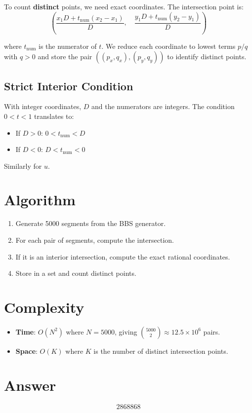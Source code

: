 \documentclass[12pt]{article}
\begin{document}
To count \textbf{distinct} points, we need exact coordinates. The intersection point is:
\[
\left(\frac{x_1 D + t_{\text{num}} (x_2 - x_1)}{D}, \quad \frac{y_1 D + t_{\text{num}} (y_2 - y_1)}{D}\right)
\]

where $t_{\text{num}}$ is the numerator of $t$. We reduce each coordinate to lowest terms $p/q$ with $q > 0$ and store the pair $((p_x, q_x), (p_y, q_y))$ to identify distinct points.

\subsection{Strict Interior Condition}

With integer coordinates, $D$ and the numerators are integers. The condition $0 < t < 1$ translates to:
\begin{itemize}
    \item If $D > 0$: $0 < t_{\text{num}} < D$
    \item If $D < 0$: $D < t_{\text{num}} < 0$
\end{itemize}
Similarly for $u$.

\section{Algorithm}
\begin{enumerate}
    \item Generate 5000 segments from the BBS generator.
    \item For each pair of segments, compute the intersection.
    \item If it is an interior intersection, compute the exact rational coordinates.
    \item Store in a set and count distinct points.
\end{enumerate}

\section{Complexity}
\begin{itemize}
    \item \textbf{Time}: $O(N^2)$ where $N = 5000$, giving $\binom{5000}{2} \approx 12.5 \times 10^6$ pairs.
    \item \textbf{Space}: $O(K)$ where $K$ is the number of distinct intersection points.
\end{itemize}

\section{Answer}

\[
\boxed{2868868}
\]
\end{document}
